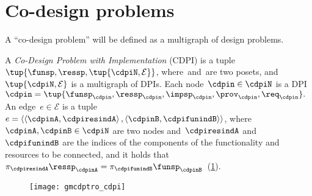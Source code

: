 

\section{Co-design problems}
\label{sec:Co-design-problems}

A ``co-design problem'' will be defined as a multigraph of design
problems.
\begin{definition}
    \label{def:cdpi}
    A \emph{Co-Design Problem with Implementation} (CDPI)
    is a tuple~$\tup{\funsp,\ressp,\tup{\cdpiN,\mathcal{E}}}$,
    where~\funsp and~\ressp are two posets, and~$\tup{ \cdpiN,\mathcal{E}} $
    is a multigraph of DPIs. Each node~$\cdpin\in\cdpiN$ is a
    DPI~$\cdpin=\tup{\funsp_{\cdpin},\ressp_{\cdpin},\impsp_{\cdpin},\prov_{\cdpin},\req_{\cdpin}}.$
    An edge~$e\in\mathcal{E}$ is a tuple $e=\left\langle \left\langle \cdpinA,\cdpiresindA\right\rangle ,\left\langle \cdpinB,\cdpifunindB\right\rangle \right\rangle $,
    where~$\cdpinA,\cdpinB\in\cdpiN$ are two nodes and~$\cdpiresindA$
    and~$\cdpifunindB$ are the indices of the components of the functionality
    and resources to be connected, and it holds that~$\pi_{\cdpiresindA}\ressp_{\cdpinA}=\pi_{\cdpifunindB}\funsp_{\cdpinB}$~(\cref{fig:mcdps}).

    \begin{figure}[h]
        \centering
        \texttt{[image: gmcdptro\_cdpi]}
        \caption{\label{fig:mcdps}}
    \end{figure}


\end{definition}

